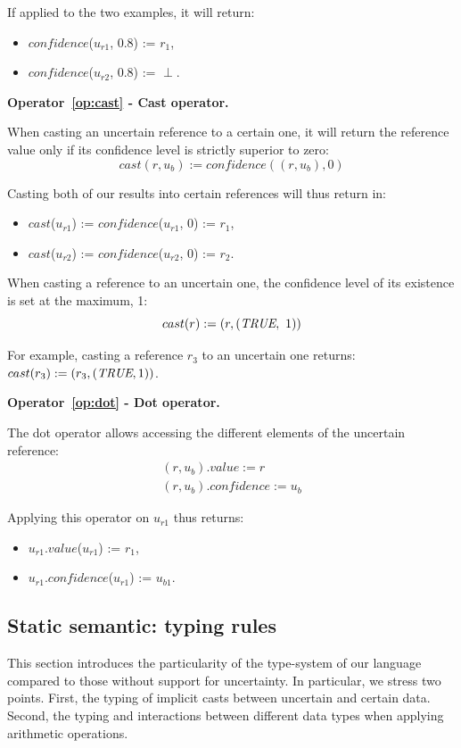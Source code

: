 If applied to the two examples, it will return:
\begin{itemize}
    \item $confidence$($u_{r1}$, 0.8) := $r_1$,
    \item $confidence$($u_{r2}$, 0.8) := $\perp$.
\end{itemize}

\bigskip

\noindent\textbf{Operator~\ref{op:cast} - Cast operator.~}

When casting an uncertain reference to a certain one, it will return the reference value only if its  confidence level is strictly superior to zero:
\[cast(r, u_b) := confidence((r, u_b), 0)\]

Casting both of our results into certain references will thus return in:
\begin{itemize}
    \item $cast$($u_{r1}$) := $confidence$($u_{r1}$, 0) := $r_1$,
    \item $cast$($u_{r2}$) := $confidence$($u_{r2}$, 0) := $r_2$.
\end{itemize}

When casting a reference to an uncertain one, the confidence level of its existence is set at the maximum, 1:
\[cast(r) := (r, (\textit{TRUE}{},~1))\]

For example, casting a reference $r_3$ to an uncertain one returns: $cast(r_3) := (r_3, (\textit{TRUE}{}, 1))$.

\bigskip

\noindent\textbf{Operator~\ref{op:dot} - Dot operator.~}

The dot operator allows accessing the different elements of the uncertain reference: 
\begin{align*}
	(r, u_b).value := r\\
	(r, u_b).confidence := u_b
\end{align*}

Applying this operator on $u_{r1}$ thus returns:
\begin{itemize}
	\item $u_{r1}$.$value$($u_{r1}$) := $r_1$,
	\item $u_{r1}$.$confidence$($u_{r1}$) := $u_{b1}$.
\end{itemize}

\subsection{Static semantic: typing rules}
\label{subsec:type-system}
This section introduces the particularity of the type-system of our language compared to those without support for uncertainty. 
In particular, we stress two points.
First, the typing of implicit casts between uncertain and certain data.
Second, the typing and interactions between different data types when applying arithmetic operations.

